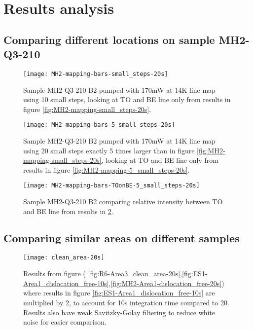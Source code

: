 \section{Results analysis}

\subsection{Comparing different locations on sample MH2-Q3-210}

\begin{figure}[H]
\centering
\texttt{[image: MH2-mapping-bars-small\_steps-20s]}
\caption[MH2-Q3-210 line mapping]{Sample MH2-Q3-210 B2 pumped with 170mW at 14K line map using 10 small steps, looking at TO and BE line only from results in figure \ref{fig:MH2-mapping-small_steps-20s}.}
\label{fig:MH2-mapping-bars-small_steps-20s}%
\end{figure}

\begin{figure}[H]
\centering
\texttt{[image: MH2-mapping-bars-5\_small\_steps-20s]}
\caption[MH2-Q3-210 line mapping]{Sample MH2-Q3-210 B2 pumped with 170mW at 14K line map using 20 small steps exactly 5 times larger than in figure \ref{fig:MH2-mapping-small_steps-20s}, looking at TO and BE line only from results in figure \ref{fig:MH2-mapping-5_small_steps-20s}.}
\label{fig:MH2-mapping-bars-5_small_steps-20s}%
\end{figure}


\begin{figure}[H]
\centering
\texttt{[image: MH2-mapping-bars-TOonBE-5\_small\_steps-20s]}
\caption[MH2-Q3-210 line mapping]{Sample MH2-Q3-210 B2 comparing relative intensity between TO and BE line from results in \ref{fig:MH2-mapping-bars-5_small_steps-20s}.}
\label{fig:MH2-mapping-bars-TOonBE-5_small_steps-20s}%
\end{figure}

\subsection{Comparing similar areas on different samples}


\begin{figure}[H]
\centering
\texttt{[image: clean\_area-20s]}
\caption[Comparisons in a clean area]{Results from figure ( \ref{fig:R6-Area3_clean_area-20s},\ref{fig:ES1-Area1_dislocation_free-10s},\ref{fig:MH2-Area1-dislocation_free-20s}) where results in figure \ref{fig:ES1-Area1_dislocation_free-10s} are multiplied by 2, to account for 10s integration time compared to 20. Results also have weak Savitzky-Golay filtering to reduce white noise for easier comparison.}
\label{fig:clean_area-20s_comparison}%
\end{figure}

